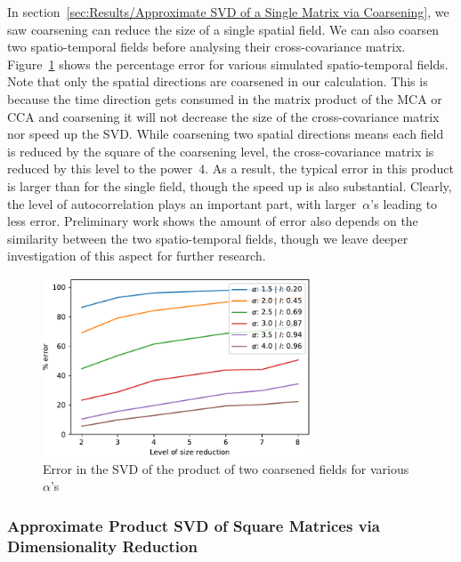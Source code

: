 \documentclass[ijgi,article,submit,moreauthors,pdftex,10pt,a4paper]{Definitions/mdpi}
\begin{document}
In section~\ref{sec:Results/Approximate SVD of a Single Matrix via Coarsening}, we saw coarsening can reduce the size of a single spatial field. We can also coarsen two spatio-temporal fields before analysing their cross-covariance matrix. Figure~\ref{fig:plotProductSpatialTemporalFieldsViaCoarsening} shows the percentage error for various simulated spatio-temporal fields. Note that only the spatial directions are coarsened in our calculation. This is because the time direction gets consumed in the matrix product of the MCA or CCA and coarsening it will not decrease the size of the cross-covariance matrix nor speed up the SVD. While coarsening two spatial directions means each field is reduced by the square of the coarsening level, the cross-covariance matrix is reduced by this level to the power~$4$. As a result, the typical error in this product is larger than for the single field, though the speed up is also substantial. Clearly, the level of autocorrelation plays an important part, with larger~$\alpha$'s leading to less error. Preliminary work shows the amount of error also depends on the similarity between the two spatio-temporal fields, though we leave deeper investigation of this aspect for further research. 

\begin{figure}[H]
\centering
\includegraphics[width=80mm]{Results/plotProductSpatialTemporalFieldsViaCoarsening.pdf}
\caption[Error after coarsening]{Error in the SVD of the product of two coarsened fields for various $\alpha$'s}
\label{fig:plotProductSpatialTemporalFieldsViaCoarsening}
\end{figure}

\subsubsection{Approximate Product SVD of Square Matrices via Dimensionality Reduction}
\label{sec:Results/Approximate Product SVD of Square Matrices via Dimensionality Reduction}
\end{document}
